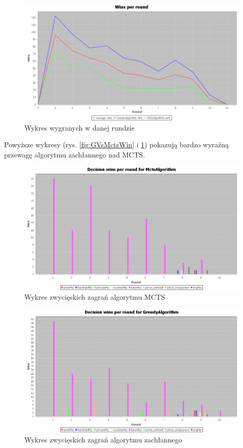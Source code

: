 \begin{figure}[H]
	\centering
	\includegraphics[width=\textwidth]{Resources/MirrorMctsVG/GVsMctsRoundWin.PNG}
	\caption{Wykres wygranych w danej rundzie} 
	\label{fig:GVsMctsRoundWin}
\end{figure}

Powyższe wykresy (rys. \ref{fig:GVsMctsWin} i \ref{fig:GVsMctsRoundWin}) pokazują bardzo wyraźną przewagę algorytmu zachłannego nad MCTS.

\begin{figure}[H]
	\centering
	\includegraphics[width=\textwidth]{Resources/MirrorMctsVG/MctsVsGDecision.PNG}
	\caption{Wykres zwycięskich zagrań algorytmu MCTS} 
	\label{fig:MctsVsGDecision}
\end{figure} 

\begin{figure}[H]
	\centering
	\includegraphics[width=\textwidth]{Resources/MirrorMctsVG/GVsMctsDecision.PNG}
	\caption{Wykres zwycięskich zagrań algorytmu zachłannego} 
	\label{fig:GVsMctsDecision}
\end{figure} 

